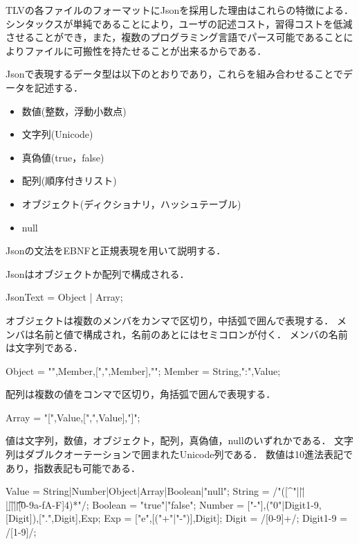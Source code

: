 TLVの各ファイルのフォーマットにJsonを採用した理由はこれらの特徴による．
シンタックスが単純であることにより，ユーザの記述コスト，習得コストを低減させることができ，また，複数のプログラミング言語でパース可能であることによりファイルに可搬性を持たせることが出来るからである．

Jsonで表現するデータ型は以下のとおりであり，これらを組み合わせることでデータを記述する．
\begin{itemize}
\setlength{\itemsep}{0.5\itemsep}
\item 数値(整数，浮動小数点)
\item 文字列(Unicode)
\item 真偽値(true，false)
\item 配列(順序付きリスト)
\item オブジェクト(ディクショナリ，ハッシュテーブル)
\item null
\end{itemize}

Jsonの文法をEBNFと正規表現を用いて説明する．

Jsonはオブジェクトか配列で構成される．

\begin{EBNF}
JsonText = Object | Array;
\end{EBNF}

オブジェクトは複数のメンバをカンマで区切り，中括弧で囲んで表現する．
メンバは名前と値で構成され，名前のあとにはセミコロンが付く．
メンバの名前は文字列である．

\begin{EBNF}
Object = "{",Member,[{",",Member}],"}";
Member = String,":",Value;
\end{EBNF}

配列は複数の値をコンマで区切り，角括弧で囲んで表現する．

\begin{EBNF}
Array = "[",Value,[{",",Value}],"]";
\end{EBNF}

値は文字列，数値，オブジェクト，配列，真偽値，nullのいずれかである．
文字列はダブルクオーテーションで囲まれたUnicode列である．
数値は10進法表記であり，指数表記も可能である．

\begin{EBNF}
Value = String|Number|Object|Array|Boolean|"null";
String = /"([^"\]|\n|\"|\\|\b|\f|\r|\t|\u[0-9a-fA-F]{4})*"/;
Boolean = "true"|"false";
Number = ["-"],("0"|Digit1-9,[Digit]),[".",Digit],Exp;
Exp = ["e",[("+"|"-")],Digit];
Digit = /[0-9]+/;
Digit1-9 = /[1-9]/;
\end{EBNF}

